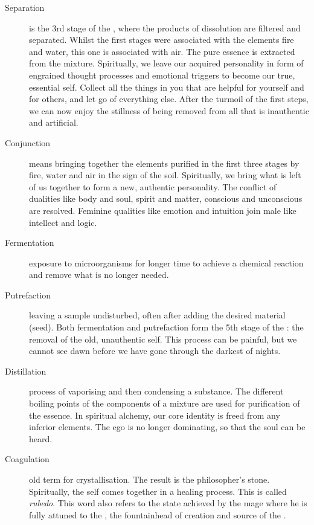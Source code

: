 \documentclass[british,final,landscape]{scrartcl}
\begin{document}
\begin{refsection}
\begin{description}
  \item[Separation]{is the 3rd stage of the , where the products of dissolution are filtered and separated. Whilst the first stages were associated with the elements fire and water, this one is associated with air. The pure essence is extracted from the mixture. Spiritually, we leave our acquired personality in form of engrained thought processes and emotional triggers to become our true, essential self. Collect all the things in you that are helpful for yourself and for others, and let go of everything else. After the turmoil of the first steps, we can now enjoy the stillness of being removed from all that is inauthentic and artificial. }
  \item[Conjunction]{means bringing together the elements purified in the first three stages by fire, water and air in the sign of the soil. Spiritually, we bring what is left of us together to form a new, authentic personality. The conflict of dualities like body and soul, spirit and matter, conscious and unconscious are resolved. Feminine qualities like emotion and intuition join male like intellect and logic.  }
  \item[Fermentation]{exposure to microorganisms for longer time to achieve a chemical reaction and remove what is no longer needed. }
  \item[Putrefaction]{leaving a sample undisturbed, often after adding the desired material (seed). Both fermentation and putrefaction form the 5th stage of the : the removal of the old, unauthentic self. This process can be painful, but we cannot see dawn before we have gone through the darkest of nights. }
  \item[Distillation]{process of vaporising and then condensing a substance. The different boiling points of the components of a mixture are used for purification of the essence. In spiritual alchemy, our core identity is freed from any inferior elements. The ego is no longer dominating, so that the soul can be heard. }
  \item[Coagulation]{old term for crystallisation. The result is the philosopher's stone. Spiritually, the self comes together in a healing process. This is called \emph{rubedo}. This word also refers to the state achieved by the mage where he is fully attuned to the , the fountainhead of creation and source of the . }
\end{description}


\end{refsection}
\end{document}
